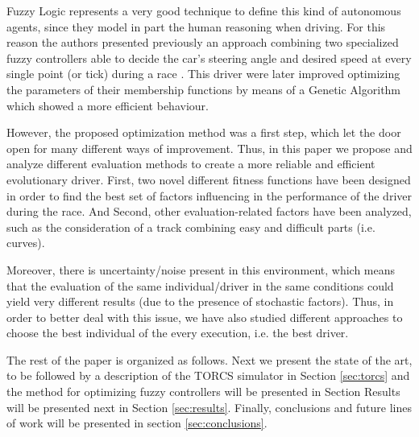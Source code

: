\documentclass[sigconf]{acmart}
\begin{document}
Fuzzy Logic \cite{Fuzzy2011} represents a very good technique to define this kind of autonomous agents, since they model in part the human reasoning when driving.
For this reason the authors presented previously an approach combining two specialized fuzzy controllers able to decide the car's steering angle and desired speed at every single point (or tick) during a race \cite{evo17}. This driver were later improved \cite{evo18} optimizing the parameters of their membership functions by means of a Genetic Algorithm \cite{GAs_Goldberg89} which showed a more efficient behaviour.

However, the proposed optimization method was a first step, which let the door open for many different ways of improvement. Thus, in this paper we propose and analyze different evaluation methods to create a more reliable and efficient evolutionary driver. First, two novel different fitness functions have been designed in order to find the best set of factors influencing in the performance of the driver during the race.
And Second,  other evaluation-related factors have been analyzed, such as the consideration of a track combining easy and difficult parts (i.e. curves).

Moreover, there is uncertainty/noise present in this environment, which means that the evaluation of the same individual/driver in the same conditions could yield very different results (due to the presence of stochastic factors). Thus, in order to better deal with this issue, we have also studied different approaches to choose the best individual of the every execution, i.e. the best driver.



The rest of the paper is organized as follows. Next we present the
state of the art, to be followed by a description of the TORCS
simulator in Section \ref{sec:torcs} and the
method for optimizing fuzzy controllers will be presented in Section
Results will be presented next in Section \ref{sec:results}. Finally, conclusions and future lines of work will
be presented in section \ref{sec:conclusions}.
\end{document}
